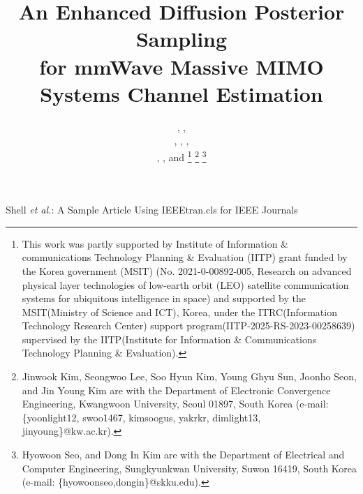 \documentclass[lettersize,journal]{IEEEtran}
\begin{document}
\title{An Enhanced Diffusion Posterior Sampling \\ for mmWave Massive MIMO Systems Channel Estimation}

\author{,  ,

, ,
,

, , and 
\thanks{This work was partly supported by Institute of Information \& communications Technology Planning \& Evaluation (IITP) grant funded by the Korea government (MSIT) (No. 2021-0-00892-005, Research on advanced physical layer technologies of low-earth orbit (LEO) satellite communication systems for ubiquitous intelligence in space) and supported by the MSIT(Ministry of Science and ICT), Korea, under the ITRC(Information Technology Research Center) support program(IITP-2025-RS-2023-00258639) supervised by the IITP(Institute for Information \& Communications Technology Planning \& Evaluation).}%
\thanks{Jinwook Kim, Seongwoo Lee, Soo Hyun Kim, Young Ghyu Sun, Joonho Seon, and Jin Young Kim are with the Department of Electronic Convergence Engineering, Kwangwoon University, Seoul 01897, South Korea (e-mail: \{yoonlight12, swoo1467, kimsoogus, yakrkr, dimlight13, jinyoung\}@kw.ac.kr).}
\thanks{Hyowoon Seo, and Dong In Kim are with the Department of Electrical and Computer Engineering, Sungkyunkwan University, Suwon 16419, South Korea (e-mail: \{hyowoonseo,dongin\}@skku.edu).}}


%
{Shell \MakeLowercase{\textit{et al.}}: A Sample Article Using IEEEtran.cls for IEEE Journals}
\end{document}
